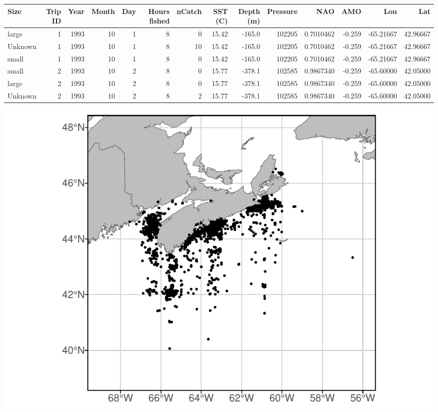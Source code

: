 \documentclass[
]{article}
\let\origfigure\figure
\let\endorigfigure\endfigure
\renewenvironment{figure}[1][2] {
    \expandafter\origfigure\expandafter[H]
} {
    \endorigfigure
}
\let\origtable\table
\let\endorigtable\endtable
\renewenvironment{table}[1][2] {
    \expandafter\origtable\expandafter[H]
} {
    \endorigtable
}
\begin{document}
\begin{landscape}\begin{table}[H]

\caption{\label{tab:mergecan}Canadian commercial data example}
\centering
\begin{tabular}[t]{lrrrrrrrrrrrrr}
\toprule
Size & Trip
ID & Year & Month & Day & Hours
fished & nCatch & SST
(C) & Depth
(m) & Pressure & NAO & AMO & Lon & Lat\\
\midrule
large & 1 & 1993 & 10 & 1 & 8 & 0 & 15.42 & -165.0 & 102205 & 0.7010462 & -0.259 & -65.21667 & 42.96667\\
Unknown & 1 & 1993 & 10 & 1 & 8 & 10 & 15.42 & -165.0 & 102205 & 0.7010462 & -0.259 & -65.21667 & 42.96667\\
small & 1 & 1993 & 10 & 1 & 8 & 0 & 15.42 & -165.0 & 102205 & 0.7010462 & -0.259 & -65.21667 & 42.96667\\
small & 2 & 1993 & 10 & 2 & 8 & 0 & 15.77 & -378.1 & 102585 & 0.9867340 & -0.259 & -65.60000 & 42.05000\\
large & 2 & 1993 & 10 & 2 & 8 & 0 & 15.77 & -378.1 & 102585 & 0.9867340 & -0.259 & -65.60000 & 42.05000\\
\addlinespace
Unknown & 2 & 1993 & 10 & 2 & 8 & 2 & 15.77 & -378.1 & 102585 & 0.9867340 & -0.259 & -65.60000 & 42.05000\\
\bottomrule
\end{tabular}
\end{table}
\end{landscape}

\begin{figure}
\centering
\includegraphics{Model_Prelim_Report_files/figure-latex/canadianplot-1.pdf}
\caption{\label{fig:canadianplot}Fig. 3: Spatial distribution of Canadian commercial catch}
\end{figure}
\end{document}
